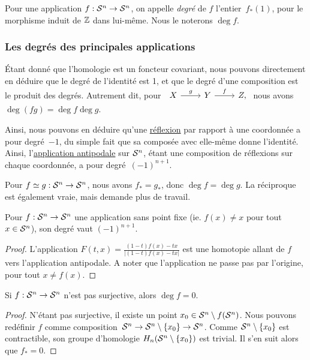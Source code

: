 \begin{definition}
Pour une application $f:\mathcal{S}^{n}\to\mathcal{S}^{n}$, on appelle \emph{degré} de $f$ l'entier~$f_\ast(1)$, pour le morphisme induit de $\mathbb{Z}$ dans lui-même. Nous le noterons $\deg f$.
\end{definition}

\subsubsection{Les degrés des principales applications}

Étant donné que l'homologie est un foncteur covariant, nous pouvons directement en déduire que le degré de l'identité est 1, et que le degré d'une composition est le produit des degrés. Autrement dit, pour~$\begin{tikzcd}
X\arrow[r,"g"]&Y\arrow[r,"f"]&Z,
\end{tikzcd}$ nous avons $\deg(fg)=\deg f\deg g$.

Ainsi, nous pouvons en déduire qu'une \underline{réflexion} par rapport à une coordonnée a pour degré~$-1$, du simple fait que sa composée avec elle-même donne l'identité. Ainsi, l'\underline{application antipodale} sur $\mathcal{S}^{n}$, étant une composition de réflexions sur chaque coordonnée, a pour degré~$(-1)^{n+1}$.

Pour $f\simeq g:\mathcal{S}^{n}\to\mathcal{S}^{n}$, nous avons $f_\ast=g_\ast$, donc $\deg f=\deg g$. La réciproque est également vraie, mais demande plus de travail.

\begin{proposition}\label{prop:deg-fixed-point}
Pour $f:\mathcal{S}^{n}\to\mathcal{S}^{n}$ une application sans point fixe (ie. $f(x)\neq x$ pour tout~${x\in\mathcal{S}^{n}}$), son degré vaut $(-1)^{n+1}$.
\end{proposition}
\begin{proof}
L'application $F(t,x)=\frac{(1-t)f(x)-tx}{|(1-t)f(x)-tx|}$ est une homotopie allant de $f$ vers l'application antipodale. A noter que l'application ne passe pas par l'origine, pour tout $x\neq f(x)$.
\end{proof}

\begin{proposition}\label{prop:deg-surj}
Si $f:\mathcal{S}^{n}\to\mathcal{S}^{n}$ n'est pas surjective, alors $\deg f=0$.
\end{proposition}
\begin{proof}
N'étant pas surjective, il existe un point $x_0\in \mathcal{S}^{n}\setminus f(\mathcal{S}^{n})$. Nous pouvons redéfinir $f$ comme composition~$\mathcal{S}^{n}\to\mathcal{S}^{n}\setminus\{x_0\}\to\mathcal{S}^{n}$. Comme $\mathcal{S}^{n}\setminus\{x_0\}$ est contractible, son groupe d'homologie $H_n(\mathcal{S}^{n}\setminus\{x_0\})$ est trivial. Il s'en suit alors que $f_\ast=0$.
\end{proof}

